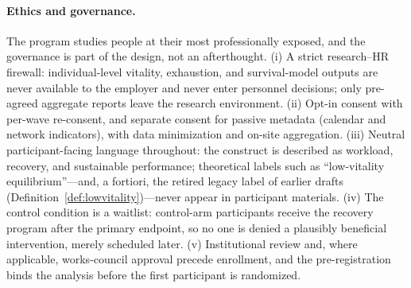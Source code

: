 \paragraph{Ethics and governance.}
The program studies people at their most professionally exposed, and the
governance is part of the design, not an afterthought. (i) A strict
research--HR firewall: individual-level vitality, exhaustion, and
survival-model outputs are never available to the employer and never enter
personnel decisions; only pre-agreed aggregate reports leave the research
environment. (ii) Opt-in consent with per-wave re-consent, and separate
consent for passive metadata (calendar and network indicators), with data
minimization and on-site aggregation. (iii) Neutral participant-facing
language throughout: the construct is described as workload, recovery, and
sustainable performance; theoretical labels such as ``low-vitality
equilibrium''---and, a fortiori, the retired legacy label of earlier
drafts (Definition~\ref{def:lowvitality})---never appear in participant
materials. (iv) The control condition is a waitlist: control-arm
participants receive the recovery program after the primary endpoint, so no
one is denied a plausibly beneficial intervention, merely scheduled later.
(v) Institutional review and, where applicable, works-council approval
precede enrollment, and the pre-registration binds the analysis before the
first participant is randomized.
